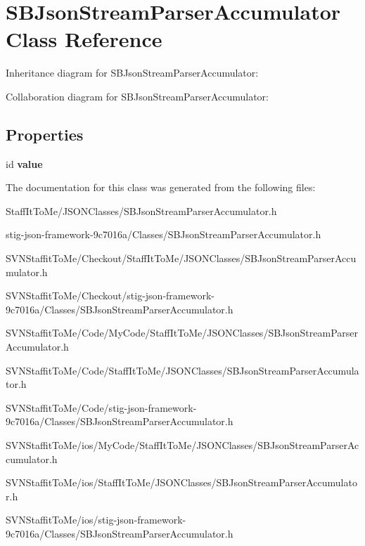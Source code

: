 \hypertarget{interface_s_b_json_stream_parser_accumulator}{
\section{\-S\-B\-Json\-Stream\-Parser\-Accumulator \-Class \-Reference}
\label{interface_s_b_json_stream_parser_accumulator}
}


\-Inheritance diagram for \-S\-B\-Json\-Stream\-Parser\-Accumulator\-:


\-Collaboration diagram for \-S\-B\-Json\-Stream\-Parser\-Accumulator\-:
\subsection*{\-Properties}
\begin{DoxyCompactItemize}
\item 
\hypertarget{interface_s_b_json_stream_parser_accumulator_a4ec442f555b8bb24cb2f20be59dd6ca6}{
id {\bfseries value}}
\label{interface_s_b_json_stream_parser_accumulator_a4ec442f555b8bb24cb2f20be59dd6ca6}

\end{DoxyCompactItemize}


\-The documentation for this class was generated from the following files\-:\begin{DoxyCompactItemize}
\item 
\-Staff\-It\-To\-Me/\-J\-S\-O\-N\-Classes/\-S\-B\-Json\-Stream\-Parser\-Accumulator.\-h\item 
stig-\/json-\/framework-\/9c7016a/\-Classes/\-S\-B\-Json\-Stream\-Parser\-Accumulator.\-h\item 
\-S\-V\-N\-Staffit\-To\-Me/\-Checkout/\-Staff\-It\-To\-Me/\-J\-S\-O\-N\-Classes/\-S\-B\-Json\-Stream\-Parser\-Accumulator.\-h\item 
\-S\-V\-N\-Staffit\-To\-Me/\-Checkout/stig-\/json-\/framework-\/9c7016a/\-Classes/\-S\-B\-Json\-Stream\-Parser\-Accumulator.\-h\item 
\-S\-V\-N\-Staffit\-To\-Me/\-Code/\-My\-Code/\-Staff\-It\-To\-Me/\-J\-S\-O\-N\-Classes/\-S\-B\-Json\-Stream\-Parser\-Accumulator.\-h\item 
\-S\-V\-N\-Staffit\-To\-Me/\-Code/\-Staff\-It\-To\-Me/\-J\-S\-O\-N\-Classes/\-S\-B\-Json\-Stream\-Parser\-Accumulator.\-h\item 
\-S\-V\-N\-Staffit\-To\-Me/\-Code/stig-\/json-\/framework-\/9c7016a/\-Classes/\-S\-B\-Json\-Stream\-Parser\-Accumulator.\-h\item 
\-S\-V\-N\-Staffit\-To\-Me/ios/\-My\-Code/\-Staff\-It\-To\-Me/\-J\-S\-O\-N\-Classes/\-S\-B\-Json\-Stream\-Parser\-Accumulator.\-h\item 
\-S\-V\-N\-Staffit\-To\-Me/ios/\-Staff\-It\-To\-Me/\-J\-S\-O\-N\-Classes/\-S\-B\-Json\-Stream\-Parser\-Accumulator.\-h\item 
\-S\-V\-N\-Staffit\-To\-Me/ios/stig-\/json-\/framework-\/9c7016a/\-Classes/\-S\-B\-Json\-Stream\-Parser\-Accumulator.\-h\end{DoxyCompactItemize}
